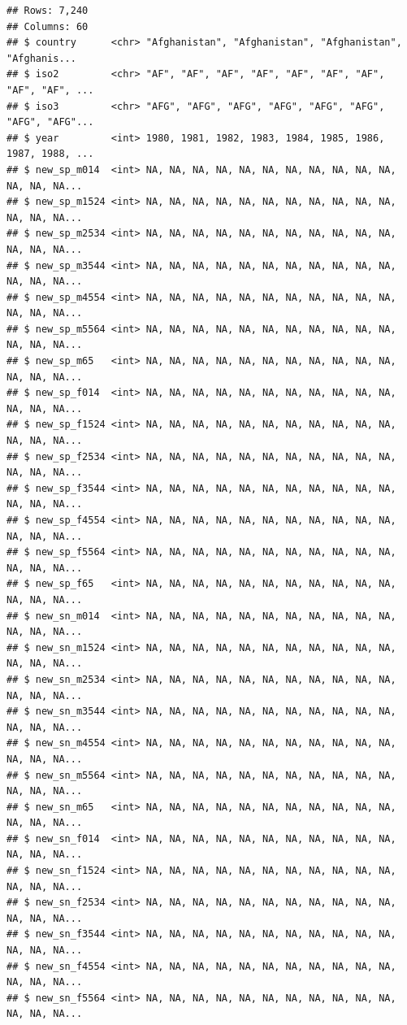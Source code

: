 \documentclass[]{tufte-book}
\begin{document}
\begin{verbatim}
## Rows: 7,240
## Columns: 60
## $ country      <chr> "Afghanistan", "Afghanistan", "Afghanistan", "Afghanis...
## $ iso2         <chr> "AF", "AF", "AF", "AF", "AF", "AF", "AF", "AF", "AF", ...
## $ iso3         <chr> "AFG", "AFG", "AFG", "AFG", "AFG", "AFG", "AFG", "AFG"...
## $ year         <int> 1980, 1981, 1982, 1983, 1984, 1985, 1986, 1987, 1988, ...
## $ new_sp_m014  <int> NA, NA, NA, NA, NA, NA, NA, NA, NA, NA, NA, NA, NA, NA...
## $ new_sp_m1524 <int> NA, NA, NA, NA, NA, NA, NA, NA, NA, NA, NA, NA, NA, NA...
## $ new_sp_m2534 <int> NA, NA, NA, NA, NA, NA, NA, NA, NA, NA, NA, NA, NA, NA...
## $ new_sp_m3544 <int> NA, NA, NA, NA, NA, NA, NA, NA, NA, NA, NA, NA, NA, NA...
## $ new_sp_m4554 <int> NA, NA, NA, NA, NA, NA, NA, NA, NA, NA, NA, NA, NA, NA...
## $ new_sp_m5564 <int> NA, NA, NA, NA, NA, NA, NA, NA, NA, NA, NA, NA, NA, NA...
## $ new_sp_m65   <int> NA, NA, NA, NA, NA, NA, NA, NA, NA, NA, NA, NA, NA, NA...
## $ new_sp_f014  <int> NA, NA, NA, NA, NA, NA, NA, NA, NA, NA, NA, NA, NA, NA...
## $ new_sp_f1524 <int> NA, NA, NA, NA, NA, NA, NA, NA, NA, NA, NA, NA, NA, NA...
## $ new_sp_f2534 <int> NA, NA, NA, NA, NA, NA, NA, NA, NA, NA, NA, NA, NA, NA...
## $ new_sp_f3544 <int> NA, NA, NA, NA, NA, NA, NA, NA, NA, NA, NA, NA, NA, NA...
## $ new_sp_f4554 <int> NA, NA, NA, NA, NA, NA, NA, NA, NA, NA, NA, NA, NA, NA...
## $ new_sp_f5564 <int> NA, NA, NA, NA, NA, NA, NA, NA, NA, NA, NA, NA, NA, NA...
## $ new_sp_f65   <int> NA, NA, NA, NA, NA, NA, NA, NA, NA, NA, NA, NA, NA, NA...
## $ new_sn_m014  <int> NA, NA, NA, NA, NA, NA, NA, NA, NA, NA, NA, NA, NA, NA...
## $ new_sn_m1524 <int> NA, NA, NA, NA, NA, NA, NA, NA, NA, NA, NA, NA, NA, NA...
## $ new_sn_m2534 <int> NA, NA, NA, NA, NA, NA, NA, NA, NA, NA, NA, NA, NA, NA...
## $ new_sn_m3544 <int> NA, NA, NA, NA, NA, NA, NA, NA, NA, NA, NA, NA, NA, NA...
## $ new_sn_m4554 <int> NA, NA, NA, NA, NA, NA, NA, NA, NA, NA, NA, NA, NA, NA...
## $ new_sn_m5564 <int> NA, NA, NA, NA, NA, NA, NA, NA, NA, NA, NA, NA, NA, NA...
## $ new_sn_m65   <int> NA, NA, NA, NA, NA, NA, NA, NA, NA, NA, NA, NA, NA, NA...
## $ new_sn_f014  <int> NA, NA, NA, NA, NA, NA, NA, NA, NA, NA, NA, NA, NA, NA...
## $ new_sn_f1524 <int> NA, NA, NA, NA, NA, NA, NA, NA, NA, NA, NA, NA, NA, NA...
## $ new_sn_f2534 <int> NA, NA, NA, NA, NA, NA, NA, NA, NA, NA, NA, NA, NA, NA...
## $ new_sn_f3544 <int> NA, NA, NA, NA, NA, NA, NA, NA, NA, NA, NA, NA, NA, NA...
## $ new_sn_f4554 <int> NA, NA, NA, NA, NA, NA, NA, NA, NA, NA, NA, NA, NA, NA...
## $ new_sn_f5564 <int> NA, NA, NA, NA, NA, NA, NA, NA, NA, NA, NA, NA, NA, NA...

\end{verbatim}
\end{document}
